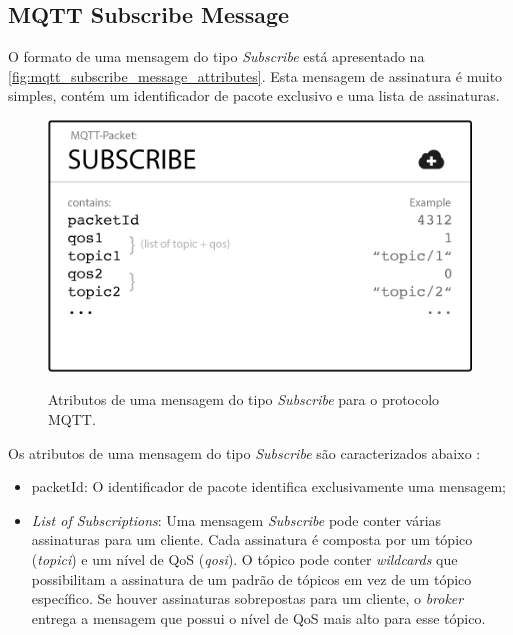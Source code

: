 \subsection{MQTT Subscribe Message}\label{subsection:mqtt_subscribe_message}

O formato de uma mensagem do tipo \textit{Subscribe} está apresentado na \autoref{fig:mqtt_subscribe_message_attributes}. Esta mensagem de assinatura é muito simples, contém um identificador de pacote exclusivo e uma lista de assinaturas.

\begin{figure}[htbp]
    \centering
    \caption{Atributos de uma mensagem do tipo \textit{Subscribe} para o protocolo MQTT.}
    \includegraphics[scale=0.5]{Imagens/mqtt_subscribe_message_attributes.png}
    \label{fig:mqtt_subscribe_message_attributes}
\end{figure}

Os atributos de uma mensagem do tipo \textit{Subscribe} são caracterizados abaixo \cite{ref:026}:

\begin{itemize}
    \item packetId: O identificador de pacote identifica exclusivamente uma mensagem;
    \item \textit{List of Subscriptions}: Uma mensagem \textit{Subscribe} pode conter várias assinaturas para um cliente. Cada assinatura é composta por um tópico (\textit{topici}) e um nível de QoS (\textit{qosi}). O tópico pode conter \textit{wildcards} que possibilitam a assinatura de um padrão de tópicos em vez de um tópico específico. Se houver assinaturas sobrepostas para um cliente, o \textit{broker} entrega a mensagem que possui o nível de QoS mais alto para esse tópico.
\end{itemize}

